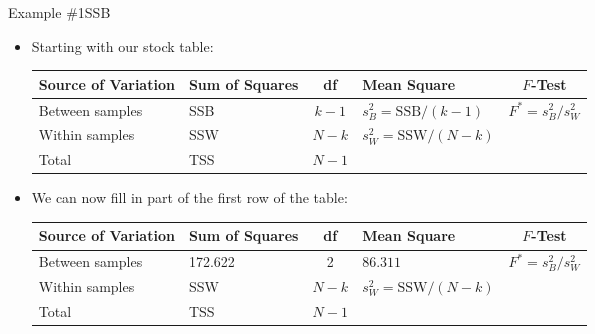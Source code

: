 \documentclass[xcolor=dvipsnames]{beamer}
\begin{document}
\begin{frame}{Example \#1}{SSB}
	\begin{itemize}
		\item Starting with our stock table: \pause
		\vspace{2mm}
		\begin{center}
			{\scriptsize
				\begin{tabular}{lp{1.2cm}cp{2.5cm}c}
					\hline 
					\textbf{Source of Variation} & \textbf{Sum of Squares} & \textbf{df} & \textbf{Mean Square} & $F$-\textbf{Test} \\ \hline 
					Between samples & SSB & $k - 1$ & $s_B^2 = \text{SSB} / (k-1)$ & $F^* = s_B^2 / s_W^2$ \\
					Within samples & SSW & $N - k$ &  $s_W^2 = \text{SSW} / (N-k)$ & \\
					Total & TSS & $N-1$ & & \\ \hline
			\end{tabular}}
		\end{center} \pause
		\vspace{5mm}
		\item We can now fill in part of the first row of the table: \pause
			\vspace{2mm}
		\begin{center}
			{\scriptsize
				\begin{tabular}{lp{1.2cm}cp{2.5cm}c}
					\hline 
					\textbf{Source of Variation} & \textbf{Sum of Squares} & \textbf{df} & \textbf{Mean Square} & $F$-\textbf{Test} \\ \hline 
					Between samples & 172.622 & 2 & $86.311$ & $F^* = s_B^2 / s_W^2$ \\
					Within samples & SSW & $N - k$ &  $s_W^2 = \text{SSW} / (N-k)$ & \\
					Total & TSS & $N-1$ & & \\ \hline
			\end{tabular}}
		\end{center}
	\end{itemize}
\end{frame}
\end{document}
